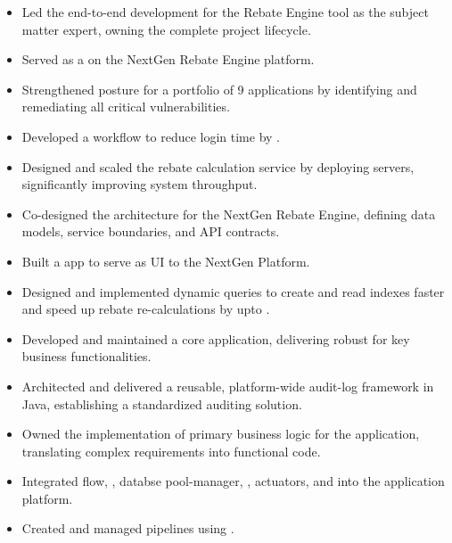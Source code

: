 \documentclass[10pt,a4paper,ragged2e, normalphoto]{altacv}
\begin{document}
\begin{itemize}
  \item Led the end-to-end development for the Rebate Engine tool as the subject matter expert, owning the complete project lifecycle.
  \item Served as a  on the NextGen Rebate Engine platform.
  \item Strengthened  posture for a portfolio of 9 applications by identifying and remediating all critical vulnerabilities.
  \item Developed a  workflow to reduce login time by .
  \item Designed and scaled the rebate calculation service by deploying  servers, significantly improving system throughput.
  \item Co-designed the architecture for the NextGen Rebate Engine, defining data models, service boundaries, and API contracts.
  \item Built a  app to serve as UI to the NextGen Platform.
  \item Designed and implemented dynamic  queries to create and read indexes faster and speed up rebate re-calculations by upto .
\end{itemize}
\begin{itemize}
	\item Developed and maintained a core  application, delivering robust  for key business functionalities.
	\item Architected and delivered a reusable, platform-wide audit-log framework in Java, establishing a standardized auditing solution.
	\item Owned the implementation of primary business logic for the application, translating complex requirements into functional code.
	\item Integrated  flow, , databse pool-manager, , actuators, and  into the application platform.
	\item Created and managed  pipelines using .
 \end{itemize}
\end{document}

